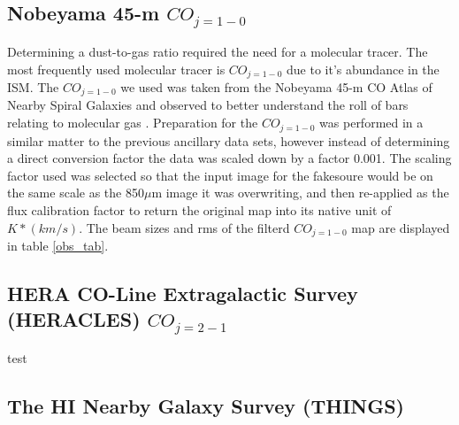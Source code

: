 \subsection{Nobeyama 45-m $CO_{j=1-0}$}

Determining a dust-to-gas ratio required the need for a molecular tracer.  The most frequently used molecular tracer is $CO_{j=1-0}$ due to it's abundance in the ISM.  The $CO_{j=1-0}$ we used was taken from the Nobeyama 45-m CO Atlas of Nearby Spiral Galaxies and observed to better understand the roll of bars relating to molecular gas \citet{kuno2007}.  Preparation for the $CO_{j=1-0}$ was performed in a similar matter to the previous ancillary data sets, however instead of determining a direct conversion factor the data was scaled down by a factor 0.001.  The scaling factor used was selected so that the input image for the fakesoure would be on the same scale as the 850$\mu$m image it was overwriting, and then re-applied as the flux calibration factor to return the original map into its native unit of $K * (km/s)$.  The beam sizes and rms of the filterd $CO_{j=1-0}$ map are displayed in table \ref{obs_tab}.

\subsection{HERA CO-Line Extragalactic Survey (HERACLES) $CO_{j=2-1}$}
test
\subsection{The HI Nearby Galaxy Survey (THINGS)}









